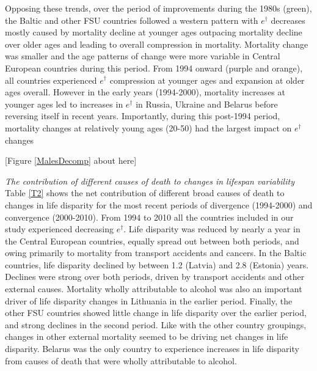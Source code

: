 \documentclass{article}
\begin{document}
\begin{spacing}{1.5}
Opposing these trends, over the period of improvements during the 1980s (green), the Baltic and other FSU countries followed a western pattern with $e^\dagger$ decreases mostly caused by mortality decline at younger ages outpacing mortality decline over older ages and leading to overall compression in mortality. Mortality change was smaller and the age patterns of change were more variable in Central European countries during this period. From 1994 onward (purple and orange), all countries experienced $e^\dagger$ compression at younger ages and expansion at older ages overall. However in the early years (1994-2000), mortality increases at younger ages led to increases in $e^\dagger$ in Russia, Ukraine and Belarus before reversing itself in recent years. Importantly, during this post-1994 period, mortality changes at relatively young ages (20-50) had the largest impact on $e^\dagger$ changes\\



\begin{center}
[Figure \ref{MalesDecomp} about here]\\
\end{center}

\emph{The contribution of different causes of death to changes in lifespan variability}\\

Table \ref{T2} shows the net contribution of different broad causes of death to changes in life disparity for the most recent periods of divergence (1994-2000) and convergence (2000-2010). From 1994 to 2010 all the countries included in our study experienced decreasing $e^\dagger$. Life disparity was reduced by nearly a year in the Central European countries, equally spread out between both periods, and owing primarily to mortality from transport accidents and cancers. In the Baltic countries, life disparity declined by between 1.2 (Latvia) and 2.8 (Estonia) years. Declines were strong over both periods, driven by transport accidents and other external causes. Mortality wholly attributable to alcohol was also an important driver of life disparity changes in Lithuania in the earlier period. Finally, the other FSU countries showed little change in life disparity over the earlier period, and strong declines in the second period. Like with the other country groupings, changes in other external mortality seemed to be driving net changes in life disparity. Belarus was the only country to experience increases in life disparity from causes of death that were wholly attributable to alcohol. \\



\end{spacing}
\end{document}

